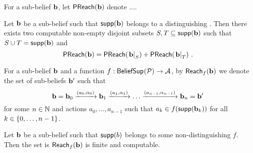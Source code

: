 %
\begin{definition}
For a sub-belief $\mathbf{b}$,
let $\mathsf{PReach}(\mathbf{b})$ denote ....
\end{definition}
%
\begin{lemma}
Let $\mathbf{b}$ be a sub-belief such that $\mathsf{supp}(\mathbf{b})$ belongs to a distinguishing \adscc{}.
Then there exists two computable non-empty disjoint subsets $S,T\subseteq \mathsf{supp}(\mathbf{b})$ such that $S\cup T = \mathsf{supp}(\mathbf{b})$ and
\[
\mathsf{PReach}(\mathbf{b}) =
\mathsf{PReach}(\left.\mathbf{b}\right|_{S}) +
\mathsf{PReach}(\left.\mathbf{b}\right|_{T}) \ .
\]
\end{lemma}
%
\begin{notation}
For a sub-belief $\mathbf{b}$ and a function $f : \mathsf{BeliefSup}_{}(\mathcal{P}) \to \mathcal{A}$,
by $\mathsf{Reach}_{f}(\mathbf{b})$ we denote the set of sub-beliefs $\mathbf{b}'$ such that
\[
\mathbf{b} =
\mathbf{b}_0 \xrightarrow{(a_0,\alpha_0)}
\mathbf{b}_1 \xrightarrow{(a_1,\alpha_1)}
\dots
\xrightarrow{(a_{n-1},\alpha_{n-1})}
\mathbf{b}_n = \mathbf{b}'
\]
for some $n\in\mathbb{N}$ and actions $a_0,\dots,a_{n-1}$ such that $a_k\in f(\mathsf{supp}(\mathbf{b}_k))$ for all $k\in\left\lbrace 0,\dots,n-1\right\rbrace$.
\end{notation}
%
\begin{lemma}
Let $\mathbf{b}$ be a sub-belief such that $\mathsf{supp}(b)$ belongs to some non-distinguishing \adscc{} $f$.
Then the set is $\mathsf{Reach}_{f}(\mathbf{b})$ is finite and computable.
\end{lemma}
%